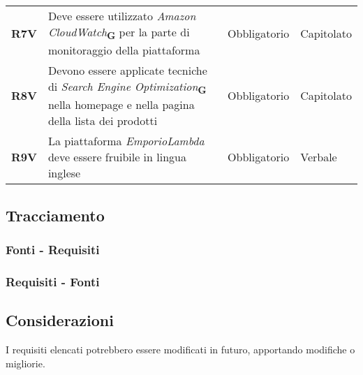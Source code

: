 \begin{center}
\begin{longtable}[!h]{p{50px} p{200px} p{100px} p{50px}}
        \textbf{R7V}                          & Deve essere utilizzato \textit{Amazon CloudWatch}\textsubscript{\textbf{G}} per la parte di monitoraggio della piattaforma                               & Obbligatorio             & Capitolato     \\
        \textbf{R8V}                          & Devono essere applicate tecniche di \textit{Search Engine Optimization}\textsubscript{\textbf{G}} nella homepage e nella pagina della lista dei prodotti & Obbligatorio             & Capitolato     \\
        \textbf{R9V}                          & La piattaforma \textit{EmporioLambda} deve essere fruibile in lingua inglese                                                                             & Obbligatorio             & Verbale        \\
    \end{longtable}
\end{center}

\newpage
\subsection{Tracciamento}
\subsubsection{Fonti - Requisiti}


\newpage
\subsubsection{Requisiti - Fonti}


\subsection{Considerazioni}
I requisiti elencati potrebbero essere modificati in futuro, apportando modifiche o migliorie.
